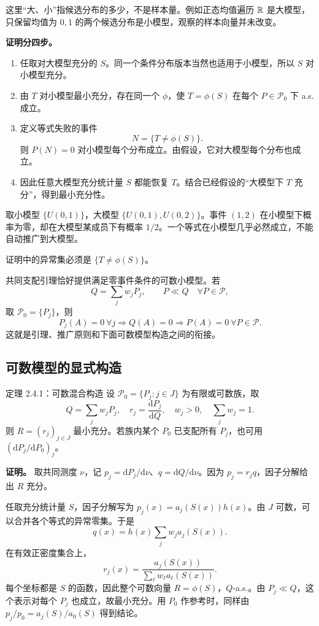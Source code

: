 这里“大、小”指候选分布的多少，不是样本量。例如正态均值遍历 $\mathbb R$ 是大模型，只保留均值为 $0,1$ 的两个候选分布是小模型，观察的样本向量并未改变。

\textbf{证明分四步。}
\begin{enumerate}
\item 任取对大模型充分的 $S$。同一个条件分布版本当然也适用于小模型，所以 $S$ 对小模型充分。
\item 由 $T$ 对小模型最小充分，存在同一个 $\phi$，使 $T=\phi(S)$ 在每个 $P\in\mathcal P_0$ 下 a.s. 成立。
\item 定义等式失败的事件
\[
 N=\{T\ne\phi(S)\}.
\]
则 $P(N)=0$ 对小模型每个分布成立。由假设，它对大模型每个分布也成立。
\item 因此任意大模型充分统计量 $S$ 都能恢复 $T$。结合已经假设的“大模型下 $T$ 充分”，得到最小充分性。
\end{enumerate}

\begin{notebox}[为什么不能省略共同零事件条件？]
取小模型 $\{U(0,1)\}$，大模型 $\{U(0,1),U(0,2)\}$。事件 $(1,2)$ 在小模型下概率为零，却在大模型某成员下有概率 $1/2$。一个等式在小模型几乎必然成立，不能自动推广到大模型。

证明中的异常集必须是 $\{T\ne\phi(S)\}$。
\end{notebox}

共同支配引理恰好提供满足零事件条件的可数小模型。若
\[
 Q=\sum_jw_jP_j,\qquad P\ll Q\quad\forall P\in\mathcal P,
\]
取 $\mathcal P_0=\{P_j\}$，则
\[
 P_j(A)=0\ \forall j\Rightarrow Q(A)=0
 \Rightarrow P(A)=0\ \forall P\in\mathcal P.
\]
这就是引理、推广原则和下面可数模型构造之间的衔接。

\subsection{可数模型的显式构造}
\begin{definitionbox}{定理 2.4.1：可数混合构造}
设 $\mathcal P_0=\{P_j:j\in J\}$ 为有限或可数族，取
\[
 Q=\sum_jw_jP_j,\quad r_j=\frac{\mathrm dP_j}{\mathrm dQ},
 \quad w_j>0,\quad\sum_jw_j=1.
\]
则 $R=(r_j)_{j\in J}$ 最小充分。若族内某个 $P_0$ 已支配所有 $P_j$，也可用 $(\mathrm dP_j/\mathrm dP_0)_j$。
\end{definitionbox}

\textbf{证明。} 取共同测度 $\nu$，记 $p_j=\mathrm dP_j/\mathrm d\nu$、$q=\mathrm dQ/\mathrm d\nu$。因为 $p_j=r_jq$，因子分解给出 $R$ 充分。

任取充分统计量 $S$，因子分解写为 $p_j(x)=a_j(S(x))h(x)$。由 $J$ 可数，可以合并各个等式的异常零集。于是
\[
 q(x)=h(x)\sum_jw_ja_j(S(x)).
\]
在有效正密度集合上，
\[
 r_j(x)=\frac{a_j(S(x))}{\sum_\ell w_\ell a_\ell(S(x))}.
\]
每个坐标都是 $S$ 的函数，因此整个可数向量 $R=\phi(S)$，$Q$-a.s.。由 $P_j\ll Q$，这个表示对每个 $P_j$ 也成立，故最小充分。用 $P_0$ 作参考时，同样由 $p_j/p_0=a_j(S)/a_0(S)$ 得到结论。

